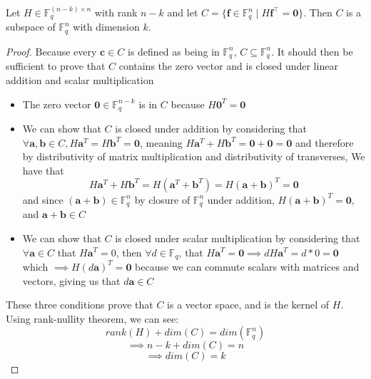 \begin{lemma}
    \label{lemma:parity-check-imp-subspace}
    Let $H \in \mathbb{F}^{(n-k) \times n}_{q}$ with rank $n-k$ and let $C = \{\mathbf{f} \in \mathbb{F}^{n}_{q} \mid H\mathbf{f}^{\intercal} = \mathbf{0}\}$.
    Then $C$ is a subspace of $\mathbb{F}^{n}_{q}$ with dimension $k$.
\end{lemma}

\begin{proof}
Because every $\mathbf{c}\in C$ is defined as being in $\mathbb{F}^{n}_{q}$, $C \subseteq \mathbb{F}^{n}_{q}$. It should then be sufficient to prove that $C$ contains the zero vector and is closed under linear addition and scalar multiplication
\begin{itemize}
    \item The zero vector $\mathbf{0}\in \mathbb{F}^{n-k}_{q}$ is in $C$ because $H\mathbf{0}^T=\mathbf{0}$
    \item We can show that $C$ is closed under addition by considering that $\forall \mathbf{a},\mathbf{b}\in C, H\mathbf{a}^T=H\mathbf{b}^T=\mathbf{0}$, meaning $H\mathbf{a}^T+H\mathbf{b}^T= \mathbf{0}+\mathbf{0} = \mathbf{0}$
        and therefore by distributivity of matrix multiplication and distributivity of transverses, We have that
        \[H\mathbf{a}^T+H\mathbf{b}^T = H(\mathbf{a}^T+\mathbf{b}^T) = H(\mathbf{a}+\mathbf{b})^T = \mathbf{0}\]
        and since $(\mathbf{a}+\mathbf{b})\in \mathbb{F}^{n}_{q}$ by closure of $\mathbb{F}^{n}_{q}$ under addition, $H(\mathbf{a}+\mathbf{b})^T = \mathbf{0}$, and $\mathbf{a}+\mathbf{b}\in C$
    \item We can show that $C$ is closed under scalar multiplication by considering that $\forall \mathbf{a}\in C$ that
        $H\mathbf{a}^T=0$, then $\forall d\in \mathbb{F}_{q}$, that $H\mathbf{a}^T=\mathbf{0} \implies dH\mathbf{a}^T = d*0=\mathbf{0}$
        which $\implies H(d\mathbf{a})^T=\mathbf{0}$ because we can commute scalars with matrices and vectors,
        giving us that $d\mathbf{a}\in C$
\end{itemize}
These three conditions prove that $C$ is a vector space, and is the kernel of $H$. Using rank-nullity theorem, we can see:
\[rank(H)+dim(C)=dim(\mathbb{F}^{n}_{q})\]
\[\implies n-k+dim(C)=n\]
\[\implies dim(C)=k\]

\end{proof}

